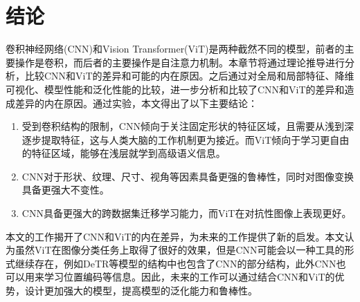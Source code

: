 \section{结论}

卷积神经网络(CNN)和Vision Transformer(ViT)是两种截然不同的模型，前者的主要操作是卷积，而后者的主要操作是自注意力机制。本章节将通过理论推导进行分析，比较CNN和ViT的差异和可能的内在原因。之后通过对全局和局部特征、降维可视化、模型性能和泛化性能的比较，进一步分析和比较了CNN和ViT的差异和造成差异的内在原因。通过实验，本文得出了以下主要结论：

\begin{enumerate}
    \item 受到卷积结构的限制，CNN倾向于关注固定形状的特征区域，且需要从浅到深逐步提取特征，这与人类大脑的工作机制更为接近。而ViT倾向于学习更自由的特征区域，能够在浅层就学到高级语义信息。
    \item CNN对于形状、纹理、尺寸、视角等因素具备更强的鲁棒性，同时对图像变换具备更强大不变性。
    \item CNN具备更强大的跨数据集迁移学习能力，而ViT在对抗性图像上表现更好。
\end{enumerate}

本文的工作揭开了CNN和ViT的内在差异，为未来的工作提供了新的启发。本文认为虽然ViT在图像分类任务上取得了很好的效果，但是CNN可能会以一种工具的形式继续存在，例如DeTR等模型的结构中也包含了CNN的部分结构，此外CNN也可以用来学习位置编码等信息。因此，未来的工作可以通过结合CNN和ViT的优势，设计更加强大的模型，提高模型的泛化能力和鲁棒性。

